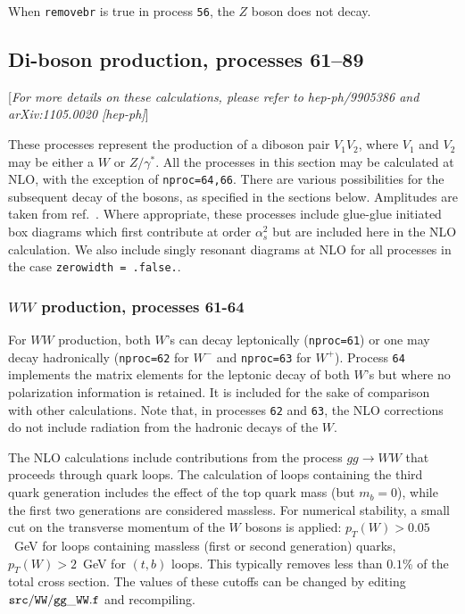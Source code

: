\documentclass[12pt]{article}
\begin{document}
When {\tt removebr} is true in process {\tt 56}, the $Z$ boson does not decay.

\subsection{Di-boson production, processes 61--89}
\label{subsec:diboson}

\begin{center}
[{\it For more details on these calculations, please refer to hep-ph/9905386
and arXiv:1105.0020 [hep-ph]}]
\end{center}

These processes represent the production of a diboson pair $V_1 V_2$,
where $V_1$ and $V_2$ may be either a $W$ or $Z/\gamma^*$. 
All the processes in this section may be calculated at NLO, with the exception
of {\tt nproc=64,66}. There are various
possibilities for the subsequent decay of the bosons, as specified in the
sections below. Amplitudes are taken from ref.~\cite{Dixon:1998py}.
Where appropriate, these processes include glue-glue initiated box diagrams
which first contribute at order $\alpha_s^2$ but are included here in the
NLO calculation. We also include singly resonant diagrams at NLO for all processes
in the case {\tt zerowidth = .false.}.

\subsubsection{$WW$ production, processes 61-64}

For $WW$ production, both $W$'s can decay leptonically ({\tt nproc=61}) or one
may decay hadronically ({\tt nproc=62} for $W^-$ and {\tt nproc=63} for $W^+$).
Process {\tt 64} implements the matrix elements for the leptonic decay of
both $W$'s but where no polarization information is retained. It is included
for the sake of comparison with other calculations. Note that, in processes
{\tt 62} and {\tt 63}, the NLO corrections do not include radiation from the
hadronic decays of the $W$.

The NLO calculations include contributions from the process $gg \to WW$
that proceeds through quark loops. The calculation of loops containing the third quark generation
includes the effect of the top quark mass (but $m_b=0$), while the first two
generations are considered massless. For numerical stability, a small cut on the
transverse momentum of the $W$ bosons is applied: $p_T(W)>0.05$~GeV for loops
containing massless (first or second generation) quarks, $p_T(W)>2$~GeV for $(t,b)$
loops. This typically removes less than $0.1$\% of the total cross section. The
values of these cutoffs can be changed by editing ${\tt src/WW/gg\_WW.f}$ and recompiling.
\end{document}
